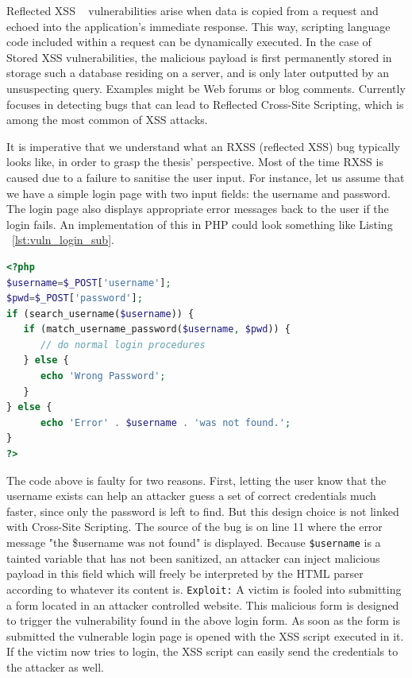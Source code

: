 Reflected XSS ~\cite{rxss_def} vulnerabilities arise when data is copied from a request and echoed into the application's immediate response. This way, scripting language code included within a request can be dynamically executed.
In the case of Stored XSS vulnerabilities, the malicious payload is first permanently stored in storage such a database residing on a server, and is only later outputted by an unsuspecting query. Examples might be Web forums or blog comments. 
Currently \pname focuses in detecting bugs that can lead to Reflected Cross-Site Scripting, which is among the most common of XSS attacks.

It is imperative that we understand what an RXSS (reflected XSS) bug typically looks like, in order to grasp the thesis' perspective. Most of the time RXSS is caused due to a failure to sanitise the user input. For instance, let us assume that we have a simple login page with two input fields: the username and password. The login page also displays appropriate error messages back to the user if the login fails. An implementation of this in PHP could look something like Listing ~\ref{lst:vuln_login_sub}.

\begin{lstlisting}[language=php, caption={Vulnerable login form.}, label={lst:vuln_login_sub}]
<?php
$username=$_POST['username'];
$pwd=$_POST['password'];
if (search_username($username)) {
   if (match_username_password($username, $pwd)) {
      // do normal login procedures
   } else {
      echo 'Wrong Password';
   }
} else {
      echo 'Error' . $username . 'was not found.';
}
?>
\end{lstlisting}

The code above is faulty for two reasons. First, letting the user know that the username exists can help an attacker guess a set of correct credentials much faster, since only the password is left to find. But this design choice is not linked with Cross-Site Scripting. The source of the bug is on line 11 where the error message "the \$username was not found" is displayed. Because {\tt \$username} is a tainted variable that has not been sanitized, an attacker can inject malicious payload in this field which will freely be interpreted by the HTML parser according to whatever its content is. 
{\tt Exploit:} A victim is fooled into submitting a form located in an attacker controlled website. This malicious form is
designed to trigger the vulnerability found in the above login form. As soon as the form is submitted the vulnerable login
page is opened with the XSS script executed in it. If the victim now tries to login, the XSS script can easily send the
credentials to the attacker as well. 

